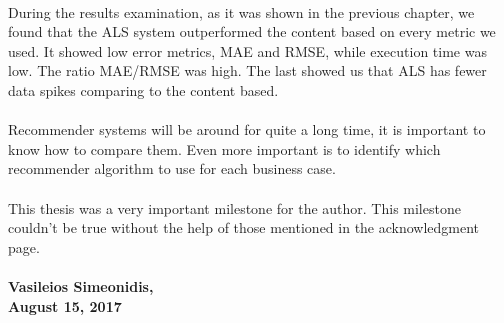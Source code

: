 \paragraph{} During the results examination, as it was shown in the previous chapter, we found that the ALS system outperformed the content based on every metric we used. It showed low error metrics, MAE and RMSE, while execution time was low. The ratio MAE/RMSE was high. The last showed us that ALS has fewer data spikes comparing to the content based.

\paragraph{} Recommender systems will be around for quite a long time, it is important to know how to compare them. Even more important is to identify which recommender algorithm to use for each business case.

\paragraph{} This thesis was a very important milestone for the author. This milestone couldn't be true without the help of those mentioned in the acknowledgment page.
\\
\paragraph{Vasileios Simeonidis, \\ August 15, 2017}